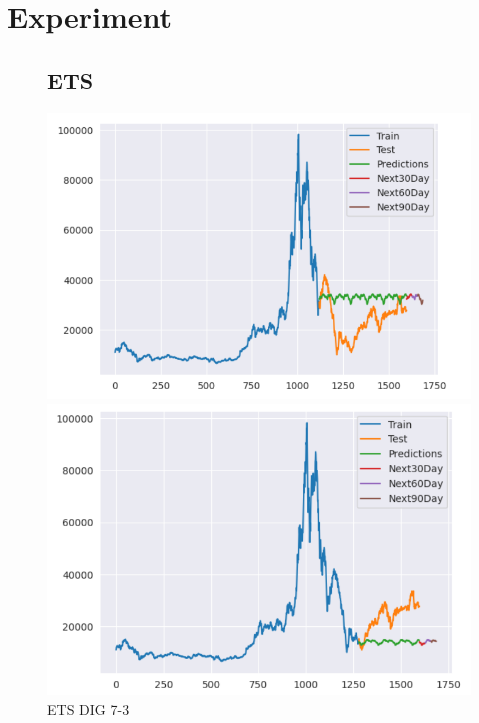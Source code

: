 \documentclass[conference]{IEEEtran}
\begin{document}
\section{Experiment}

\begin{figure}[htbp]
\subsection{ETS}
\centering
    \begin{minipage}{0.23\textwidth}
    \centering
    \includegraphics[width=1\textwidth]{experiment/ets/TEAM4_ETS_DIG_7_3.png}
    \caption{ETS DIG 7-3}
    \label{fig:nvl_boxplot}
    \end{minipage}
    \hfill
    \begin{minipage}{0.23\textwidth}
    \centering
    \includegraphics[width=1\textwidth]{experiment/ets/TEAM4_ETS_DIG_8_2.png}

\end{minipage}
\end{figure}
\end{document}
